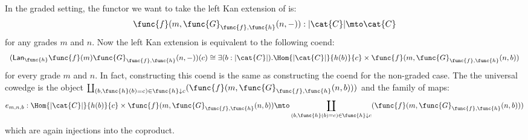 In the graded setting, the functor we want to take the left Kan
extension of is:
\[
    \func{f}(m,\func{G}_{\func{f},\func{h}}(n,-)) : |\cat{C}| \mto \cat{C}
\]
for any grades $m$ and $n$. Now the left Kan extension is equivalent to the following coend:
\[
\begin{array}{lll}
    (\Lan{\func{h}}{\func{f}(m)\func{G}_{\func{f},\func{h}}(n,-)})(c) 
    \cong 
    \exists(b : |\cat{C}|).\Hom{|\cat{C}|}{h(b)}{c} \times \func{f}(m,\func{G}_{\func{f},\func{h}}(n,b))
\end{array}
\]
for every grade $m$ and $n$.  In fact, constructing this coend is the
same as constructing the coend for the non-graded case. 
The the universal cowedge is the object $\coprod_{(b,\func{h}(b) = c)
\in \func{h} \downarrow c}(\func{f}(m,\func{G}_{\func{f},\func{h}}(n,b)))$
and the family of maps:
\[
    e_{m,n,b} : \Hom{|\cat{C}|}{h(b)}{c} \times \func{f}(m,\func{G}_{\func{f},\func{h}}(n,b)) \mto 
    \coprod_{(b,\func{h}(b) = c) \in \func{h} \downarrow c}(\func{f}(m,\func{G}_{\func{f},\func{h}}(n,b)))
\]
which are again injections into the coproduct.  

